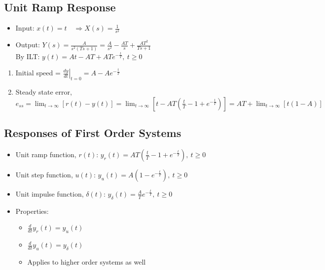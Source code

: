 \documentclass[a4paper]{article}
\begin{document}
\subsection{Unit Ramp Response}
\begin{itemize}
    \item Input: $x(t) = t\quad \Rightarrow X(s) = \displaystyle\frac{1}{s^2}$
    \item Output: $Y(s) = \displaystyle\frac{A}{s^2(Ts+1)} = \frac{A}{s^2}-\frac{AT}{s}+\frac{AT^2}{Ts+1}$\\
    By ILT: $y(t) = At-AT+ATe^{-\frac{t}{T}},\ t\geq 0$
\end{itemize}
\begin{enumerate}
    \item Initial speed = $\displaystyle\left.\frac{dy}{dt}\right|_{t=0} = A-Ae^{-\frac{t}{T}}$
    \item Steady state error, $e_{ss} = \displaystyle\lim_{t\to\infty}\left[r(t)-y(t)\right]=\displaystyle\lim_{t\to\infty}\left[t-AT\left(\displaystyle\frac{t}{T}-1+e^{-\frac{t}{T}}\right)\right] = AT+\displaystyle\lim_{t\to\infty}\left[t(1-A)\right]$
\end{enumerate}
\subsection{Responses of First Order Systems}
\begin{itemize}
    \item Unit ramp function, $r(t)$: $y_r(t) = AT\left(\frac{t}{T}-1+e^{-\frac{t}{T}}\right),\ t\geq 0$
    \item Unit step function, $u(t)$: $y_u(t) = A(1-e^{-\frac{t}{T}}),\ t\geq 0$
    \item Unit impulse function, $\delta(t)$: $y_\delta(t) =\displaystyle\frac{A}{T}e^{-\frac{t}{T}},\ t\geq 0$
    \item Properties:
    \begin{itemize}[label=$\circ$]
        \item $\displaystyle\frac{d}{dt}y_r(t) = y_u(t)$
        \item $\displaystyle\frac{d}{dt}y_u(t) = y_\delta(t)$
        \item Applies to higher order systems as well
    \end{itemize}
\end{itemize}
\end{document}
